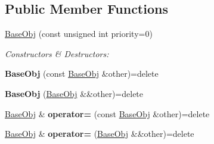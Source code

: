 \subsection*{Public Member Functions}
\begin{DoxyCompactItemize}
\item 
\hyperlink{class_helios_1_1_base_obj_ad77bdec51d537c1bfc9661b728980498}{Base\+Obj} (const unsigned int priority=0)
\begin{DoxyCompactList}\small\item\em Constructors \& Destructors\+: \end{DoxyCompactList}\item 
\hypertarget{class_helios_1_1_base_obj_aa278e49125c0c84d26906ae47cfff727}{}{\bfseries Base\+Obj} (const \hyperlink{class_helios_1_1_base_obj}{Base\+Obj} \&other)=delete\label{class_helios_1_1_base_obj_aa278e49125c0c84d26906ae47cfff727}

\item 
\hypertarget{class_helios_1_1_base_obj_ad2127aa4f505b6183a9d91d384062b98}{}{\bfseries Base\+Obj} (\hyperlink{class_helios_1_1_base_obj}{Base\+Obj} \&\&other)=delete\label{class_helios_1_1_base_obj_ad2127aa4f505b6183a9d91d384062b98}

\item 
\hypertarget{class_helios_1_1_base_obj_a499a49d6f7f7f79190e6d598eab4391e}{}\hyperlink{class_helios_1_1_base_obj}{Base\+Obj} \& {\bfseries operator=} (const \hyperlink{class_helios_1_1_base_obj}{Base\+Obj} \&other)=delete\label{class_helios_1_1_base_obj_a499a49d6f7f7f79190e6d598eab4391e}

\item 
\hypertarget{class_helios_1_1_base_obj_ab588e3ffe972a53de418f50558651f2f}{}\hyperlink{class_helios_1_1_base_obj}{Base\+Obj} \& {\bfseries operator=} (\hyperlink{class_helios_1_1_base_obj}{Base\+Obj} \&\&other)=delete\label{class_helios_1_1_base_obj_ab588e3ffe972a53de418f50558651f2f}


\end{DoxyCompactItemize}
